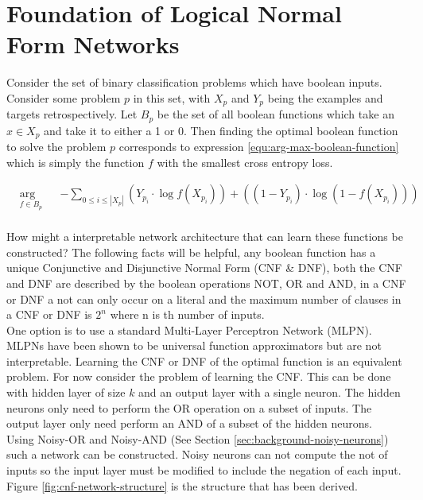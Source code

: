 \chapter{Foundation of Logical Normal Form Networks}\label{C:foundation-of-lnfns}
Consider the set of binary classification problems which have boolean inputs. Consider some problem $p$ in this set, with $X_p$ and $Y_p$ being the examples and targets retrospectively. Let $B_p$ be the set of all boolean functions which take an $x \in X_p$ and take it to either a 1 or 0. Then finding the optimal boolean function to solve the problem $p$ corresponds to expression \ref{equ:arg-max-boolean-function} which is simply the function $f$ with the smallest cross entropy loss.

\begin{equation}
\label{equ:arg-max-boolean-function}
\begin{aligned}
& \underset{f \in B_p}{\text{arg min}}
& & -\sum_{0 \leq i \leq |X_p|} (Y_{p_i} \cdot \log f(X_{p_i})) + ((1 - Y_{p_i}) \cdot \log(1 - f(X_{p_i})))  \\
\end{aligned}
\end{equation}

How might a interpretable network architecture that can learn these functions be constructed? The following facts will be helpful, any boolean function has a unique Conjunctive and Disjunctive Normal Form (CNF \& DNF), both the CNF and DNF are described by the boolean operations NOT, OR and AND, in a CNF or DNF a not can only occur on a literal and the maximum number of clauses in a CNF or DNF is $2^n$ where n is th number of inputs.\\

One option is to use a standard Multi-Layer Perceptron Network (MLPN). MLPNs have been shown to be universal function approximators but are not interpretable. Learning the CNF or DNF of the optimal function is an equivalent problem. For now consider the problem of learning the CNF. This can be done with hidden layer of size $k$ and an output layer with a single neuron. The hidden neurons only need to perform the OR operation on a subset of inputs. The output layer only need perform an AND of a subset of the hidden neurons.\\

Using Noisy-OR and Noisy-AND (See Section \ref{sec:background-noisy-neurons}) such a network can be constructed. Noisy neurons can not compute the not of inputs so the input layer must be modified to include the negation of each input. Figure \ref{fig:cnf-network-structure} is the structure that has been derived.

